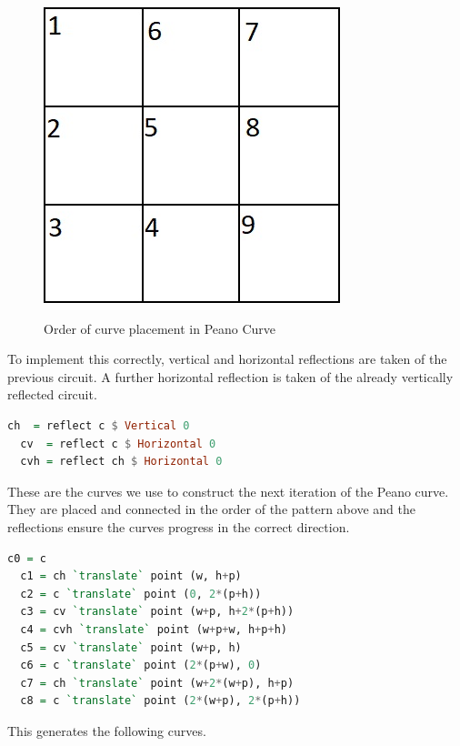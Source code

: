 \documentclass{article}
\begin{document}
\begin{figure}[h]
\caption{Order of curve placement in Peano Curve}
\center
\includegraphics{pattern.jpg}
\label{pattern}
\end{figure}

To implement this correctly, vertical and horizontal reflections are taken of the previous circuit. A further horizontal reflection is taken of the already vertically reflected circuit.

\begin{lstlisting}[language=Haskell]
  ch  = reflect c $ Vertical 0
  cv  = reflect c $ Horizontal 0
  cvh = reflect ch $ Horizontal 0
\end{lstlisting}

These are the curves we use to construct the next iteration of the Peano curve. They are placed and connected in the order of the pattern above and the reflections ensure the curves progress in the correct direction.

\begin{lstlisting}[language=Haskell]
  c0 = c
  c1 = ch `translate` point (w, h+p)
  c2 = c `translate` point (0, 2*(p+h))
  c3 = cv `translate` point (w+p, h+2*(p+h))
  c4 = cvh `translate` point (w+p+w, h+p+h)
  c5 = cv `translate` point (w+p, h)
  c6 = c `translate` point (2*(p+w), 0)
  c7 = ch `translate` point (w+2*(w+p), h+p)
  c8 = c `translate` point (2*(w+p), 2*(p+h))

\end{lstlisting}

This generates the following curves.
\end{document}
